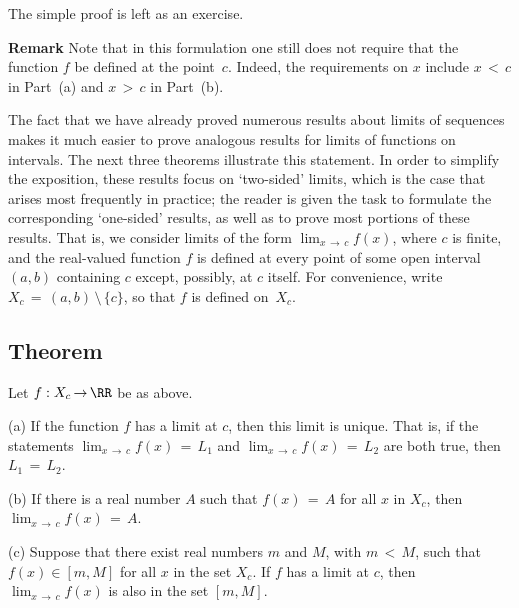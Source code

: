 \V

        The simple proof is left as an exercise. %

\V

        {\bf Remark} Note that in this formulation one still does not require that the function $f$ be defined at the point~$c$.
    Indeed, the requirements on $x$ include $x\,<\,c$ in Part~(a) and $x\,>\,c$ in Part~(b).

\VV


        The fact that we have already proved numerous results about limits of sequences
    makes it much easier to prove analogous results for limits of functions on intervals.
    The next three theorems illustrate this statement. In order to simplify the exposition,
    these results focus on `two-sided' limits, which is the case that arises most frequently in practice;
    the reader is given the task to formulate the corresponding `one-sided' results, as well as to prove most portions of these results.
    That is, we consider limits of the form $\lim_{x \,{\rightarrow}\, c} f(x)$, where $c$ is finite,
    and the real-valued function $f$ is defined at every point of some open interval $(a,b)$ containing $c$ except, possibly, at $c$ itself.
    For convenience, write $X_{c} \,=\, (a,b)\,{\setminus}\,\{c\}$, so that $f$ is defined on~$X_{c}$.

\V

            \subsection{\small{\bf Theorem}}
            \label{ThmC90.50}

        Let $f:X_{c} \,{\rightarrow}\, {\RR}$ be as above.

\V

        (a) If the function $f$ has a limit at $c$, then this limit is unique.
    That is, if the statements ${\displaystyle \lim_{x \,{\rightarrow}\, c} f(x) \,=\, L_{1}}$ and ${\displaystyle \lim_{x \,{\rightarrow}\, c} f(x) \,=\, L_{2}}$ are both true, then $L_{1} \,=\, L_{2}$.

\V

        (b) If there is a real number $A$ such that $f(x) \,=\, A$ for all $x$ in $X_{c}$, then ${\displaystyle \lim_{x \,{\rightarrow}\, c} f(x)} \,=\, A$.

\V

        (c) Suppose that there exist real numbers $m$ and $M$, with $m\,<\,M$, such that $f(x){\in}[m,M]$ for all $x$ in the set $X_{c}$.
    If $f$ has a limit at $c$, then ${\displaystyle \lim_{x \,{\rightarrow}\, c} f(x)}$ is also in the set $[m,M]$.

